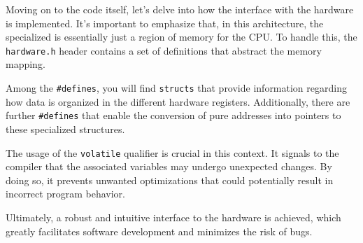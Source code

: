 \documentclass[12pt,a4paper]{article}
\begin{document}
Moving on to the code itself, let's delve into how the interface with the
hardware is implemented. It's important to emphasize that, in this
architecture, the specialized is essentially just a region of memory for the
CPU. To handle this, the \texttt{hardware.h} header contains a set of 
definitions that abstract the memory mapping.

Among the \texttt{\#defines}, you will find \texttt{structs} that provide
information regarding how data is organized in the different hardware registers.
Additionally, there are further \texttt{\#defines} that enable the conversion
of pure addresses into pointers to these specialized
structures.

The usage of the \texttt{volatile} qualifier is crucial in this context. It
signals to the compiler that the associated variables may undergo unexpected
changes. By doing so, it prevents unwanted optimizations that could potentially
result in incorrect program behavior.

Ultimately, a robust and intuitive interface to the hardware is achieved,
which greatly facilitates software development and minimizes the risk of bugs.
\end{document}
